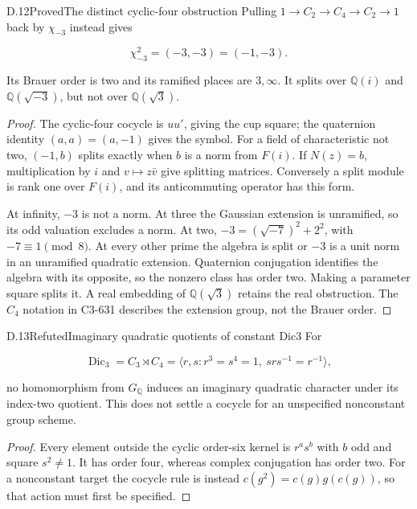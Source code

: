 \begin{statement}{D.12}{Proved}{The distinct cyclic-four obstruction}
Pulling $1\to C_2\to C_4\to C_2\to1$ back by $\chi_{-3}$
instead gives

$$
\chi_{-3}^2=(-3,-3)=(-1,-3).
$$

Its Brauer order is two and its ramified places are
$3,\infty$. It splits over $\mathbb Q(i)$ and
$\mathbb Q(\sqrt{-3})$, but not over $\mathbb Q(\sqrt3)$.
\end{statement}
\begin{proof}
The cyclic-four cocycle is $uu'$, giving the cup square;
the quaternion identity $(a,a)=(a,-1)$ gives the symbol.
For a field of characteristic not two, $(-1,b)$ splits
exactly when $b$ is a norm from $F(i)$.
If $N(z)=b$, multiplication by $i$ and
$v\mapsto z\bar v$ give splitting matrices.
Conversely a split module is rank one over $F(i)$,
and its anticommuting operator has this form.

At infinity, $-3$ is not a norm.
At three the Gaussian extension is unramified, so its
odd valuation excludes a norm.
At two, $-3=(\sqrt{-7})^2+2^2$, with $-7\equiv1\pmod8$.
At every other prime the algebra is split or $-3$ is a
unit norm in an unramified quadratic extension.
Quaternion conjugation identifies the algebra with its
opposite, so the nonzero class has order two.
Making a parameter square splits it.
A real embedding of $\mathbb Q(\sqrt3)$ retains the real
obstruction. The $C_4$ notation in C3-631 describes the
extension group, not the Brauer order.
\end{proof}

\begin{statement}{D.13}{Refuted}{Imaginary quadratic quotients of constant Dic3}
For

$$
\operatorname{Dic}_3=C_3\rtimes C_4
 =\langle r,s:r^3=s^4=1,\ srs^{-1}=r^{-1}\rangle,
$$

no homomorphism from $G_{\mathbb Q}$ induces an imaginary
quadratic character under its index-two quotient.
This does not settle a cocycle for an unspecified
nonconstant group scheme.
\end{statement}
\begin{proof}
Every element outside the cyclic order-six kernel is
$r^as^b$ with $b$ odd and square $s^2\ne1$.
It has order four, whereas complex conjugation has order two.
For a nonconstant target the cocycle rule is instead
$c(g^2)=c(g)g(c(g))$, so that action must first be specified.
\end{proof}

